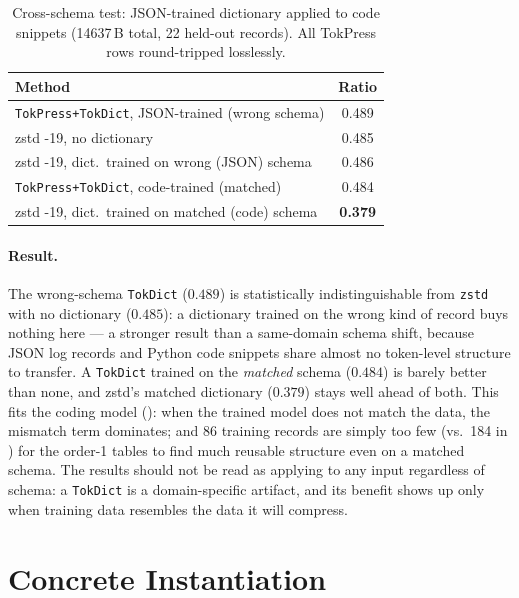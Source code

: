 \documentclass[10pt,twocolumn]{article}
\theoremstyle{plain}
\theoremstyle{definition}
\begin{document}
\begin{table}[h]
\centering\small
\caption{Cross-schema test: JSON-trained dictionary applied to code snippets
(14637\,B total, 22 held-out records). All TokPress rows round-tripped losslessly.}
\label{tab:generalize}
\begin{tabular}{@{}p{5.6cm}c@{}}
\toprule
Method & Ratio \\
\midrule
\texttt{TokPress+TokDict}, JSON-trained (wrong schema) & 0.489 \\
zstd -19, no dictionary & 0.485 \\
zstd -19, dict.\ trained on wrong (JSON) schema & 0.486 \\
\texttt{TokPress+TokDict}, code-trained (matched) & 0.484 \\
zstd -19, dict.\ trained on matched (code) schema & \textbf{0.379} \\
\bottomrule
\end{tabular}
\end{table}

\paragraph{Result.} The wrong-schema \texttt{TokDict} ($0.489$) is statistically
indistinguishable from \texttt{zstd} with no dictionary ($0.485$): a dictionary
trained on the wrong kind of record buys nothing here --- a stronger result than a
same-domain schema shift, because JSON log records and Python code snippets share
almost no token-level structure to transfer. A \texttt{TokDict} trained on the
\emph{matched} schema ($0.484$) is barely better than none, and zstd's matched
dictionary ($0.379$) stays well ahead of both. This fits the coding model
(): when the trained model does not match the data, the mismatch
term dominates; and 86 training records are simply too few (vs.\ 184 in
) for the order-1 tables to find much reusable structure even on a
matched schema. The results should not be read as applying to any input regardless
of schema: a \texttt{TokDict} is a domain-specific artifact, and its benefit shows up
only when training data resembles the data it will compress.


\section{Concrete Instantiation}\label{sec:instantiation}
\end{document}
